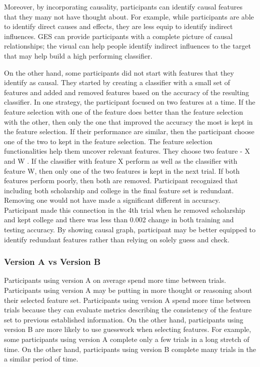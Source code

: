 Moreover, by incorporating causality, participants can identify causal features that they many not have thought about. For example, while participants are able to identify direct causes and effects, they are less equip to identify indirect influences. GES can provide participants with a complete picture of causal relationships; the visual can help people identify indirect influences to the target that may help build a high performing classifier.

On the other hand, some participants did not start with features that they identify as causal. They started by creating a classifier with a small set of features and added and removed features based on the accuracy of the resulting classifier. In one strategy, the participant focused on two features at a time. If the feature selection with one of the feature does better than the feature selection with the other, then only the one that improved the accuracy the most is kept in the feature selection. If their performance are similar, then the participant choose one of the two to kept in the feature selection.
The feature selection functionalities help them uncover relevant features. They choose two feature - X and W . If the classifier with feature X perform as well as the classifier with feature W, then only one of the two features is kept in the next trial. If both features perform poorly, then both are removed. Participant recognized that including both scholarship and college in the final feature set is redundant. Removing one would not have made a significant different in accuracy. Participant made this connection in the 4th trial when he removed scholarship and kept college and there was less than 0.002 change in both training and testing accuracy. By showing causal graph, participant may be better equipped to identify redundant features rather than relying on solely guess and check.


\subsubsection { Version A vs Version B }
Participants using version A on average spend more time between trials. Participants using version A may be putting in more thought or reasoning about their selected feature set. Participants using version A spend more time between trials because they can evaluate metrics describing the consistency of the feature set to previous established information. On the other hand, participants using version B are more likely to use guesswork when selecting features. For example, some participants using version A complete only a few trials in a long stretch of time. On the other hand, participants using version B complete many trials in the a similar period of time.

